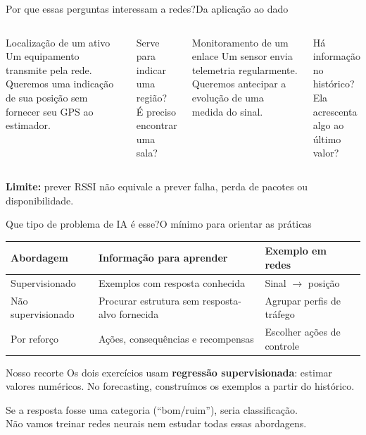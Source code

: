 \documentclass[aspectratio=169,10pt]{beamer}
\begin{document}
\begin{frame}{Por que essas perguntas interessam a redes?}{Da aplicação ao dado}
\begin{columns}[T]
\begin{block}{Localização de um ativo}
Um equipamento transmite pela rede. Queremos uma indicação de sua posição sem fornecer seu GPS ao estimador.
\end{block}
Serve para indicar uma região?\\
É preciso encontrar uma sala?
\begin{block}{Monitoramento de um enlace}
Um sensor envia telemetria regularmente. Queremos antecipar a evolução de uma medida do sinal.
\end{block}
Há informação no histórico?\\
Ela acrescenta algo ao último valor?
\end{columns}
\vspace{3mm}
\textbf{Limite:} prever RSSI não equivale a prever falha, perda de pacotes ou disponibilidade.
\end{frame}

\begin{frame}{Que tipo de problema de IA é esse?}{O mínimo para orientar as práticas}
\small
\begin{tabular}{p{3cm}p{5cm}p{4cm}}
\toprule
Abordagem & Informação para aprender & Exemplo em redes\\
\midrule
Supervisionado & Exemplos com resposta conhecida & Sinal $\rightarrow$ posição\\[2mm]
Não supervisionado & Procurar estrutura sem resposta-alvo fornecida & Agrupar perfis de tráfego\\[2mm]
Por reforço & Ações, consequências e recompensas & Escolher ações de controle\\
\bottomrule
\end{tabular}
\vspace{4mm}
\begin{block}{Nosso recorte}
Os dois exercícios usam \textbf{regressão supervisionada}: estimar valores numéricos.
No forecasting, construímos os exemplos a partir do histórico.
\end{block}
Se a resposta fosse uma categoria (``bom/ruim''), seria classificação.\\
Não vamos treinar redes neurais nem estudar todas essas abordagens.
\end{frame}
\end{document}

